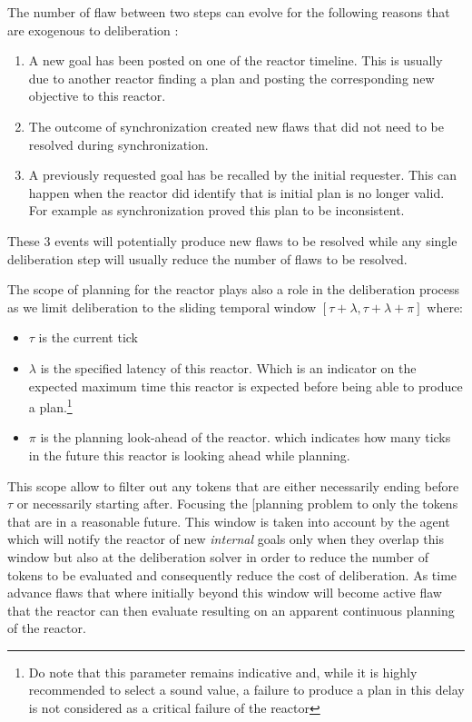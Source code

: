 The number of flaw between two steps can evolve for the following
reasons that are exogenous to deliberation :
\begin{enumerate}
\item A new goal has been posted on one of the reactor timeline. This
  is usually due to another reactor finding a plan and posting the
  corresponding new objective to this reactor.
\item The outcome of synchronization created new flaws that did not
  need to be resolved during synchronization.
\item A previously requested goal has be recalled by the initial
  requester. This can happen when the reactor did identify that is
  initial plan is no longer valid. For example as synchronization
  proved this plan to be inconsistent.
\end{enumerate}
These 3 events will potentially produce new flaws to be resolved while
any single deliberation step will usually reduce the number of flaws
to be resolved.

The scope of planning for the reactor plays also a role in the
deliberation process as we limit deliberation to the sliding temporal
window $[\tau+\lambda, \tau+\lambda+\pi]$ where:
\begin{itemize}
\item $\tau$ is the current tick
\item $\lambda$ is the specified latency of this reactor. Which is an
  indicator on the expected maximum time this reactor is expected
  before being able to produce a plan.\footnote{Do note that this
    parameter remains indicative and, while it is highly recommended to
    select a sound value, a failure to produce a plan in this delay is
    not considered as a critical failure of the reactor}
\item $\pi$ is the planning look-ahead of the reactor. which indicates
  how many ticks in the future this reactor is looking ahead while planning.
\end{itemize}
This scope allow to filter out any tokens that are either necessarily
ending before $\tau$ or necessarily starting after. Focusing the
[planning problem to only the tokens that are in a reasonable
future. This window is taken into account by the agent which will
notify the reactor of new {\em internal} goals only when they overlap
this window but also at the deliberation solver in order to reduce the
number of tokens to be evaluated and consequently reduce the cost of
deliberation. As time advance flaws that where initially beyond this
window will become active flaw that the reactor can then evaluate
resulting on an apparent continuous planning of the reactor.



